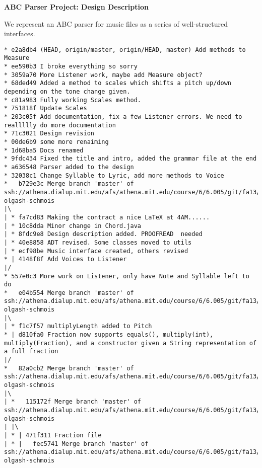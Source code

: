 \documentclass[12pt]{book}
\begin{document}
\phantom{xxx}
\bigskip
\centerline{{\large \bf ABC Parser Project: Design Description }}
\bigskip\bigskip

We represent an ABC parser for music files as a series of well-structured interfaces.

\begin{verbatim}
* e2a8db4 (HEAD, origin/master, origin/HEAD, master) Add methods to Measure
* ee590b3 I broke everything so sorry
* 3059a70 More Listener work, maybe add Measure object?
* 68ded49 Added a method to scales which shifts a pitch up/down depending on the tone change given.
* c81a983 Fully working Scales method.
* 751818f Update Scales
* 203c05f Add documentation, fix a few Listener errors. We need to reallllly do more documentation
* 71c3021 Design revision
* 00de6b9 some more renaiming
* 1d68ba5 Docs renamed
* 9fdc434 Fixed the title and intro, added the grammar file at the end
* a636548 Parser added to the design
* 32038c1 Change Syllable to Lyric, add more methods to Voice
*   b729e3c Merge branch 'master' of ssh://athena.dialup.mit.edu/afs/athena.mit.edu/course/6/6.005/git/fa13/projects/abcplayer/aivanov-olgash-schmois
|\
| * fa7cd83 Making the contract a nice LaTeX at 4AM......
| * 10c8dda Minor change in Chord.java
| * 8fdc9e8 Design description added. PROOFREAD  needed
| * 40e8858 ADT revised. Some classes moved to utils
| * ecf98be Music interface created, others revised
* | 4148f8f Add Voices to Listener
|/
* 557e0c3 More work on Listener, only have Note and Syllable left to do
*   e04b554 Merge branch 'master' of ssh://athena.dialup.mit.edu/afs/athena.mit.edu/course/6/6.005/git/fa13/projects/abcplayer/aivanov-olgash-schmois
|\
| * f1c7f57 multiplyLength added to Pitch
* | d810fa0 Fraction now supports equals(), multiply(int), multiply(Fraction), and a constructor given a String representation of a full fraction
|/
*   82a0cb2 Merge branch 'master' of ssh://athena.dialup.mit.edu/afs/athena.mit.edu/course/6/6.005/git/fa13/projects/abcplayer/aivanov-olgash-schmois
|\
| *   115172f Merge branch 'master' of ssh://athena.dialup.mit.edu/afs/athena.mit.edu/course/6/6.005/git/fa13/projects/abcplayer/aivanov-olgash-schmois
| |\
| * | 471f311 Fraction file
| * |   fec5741 Merge branch 'master' of ssh://athena.dialup.mit.edu/afs/athena.mit.edu/course/6/6.005/git/fa13/projects/abcplayer/aivanov-olgash-schmois

\end{verbatim}
\end{document}
